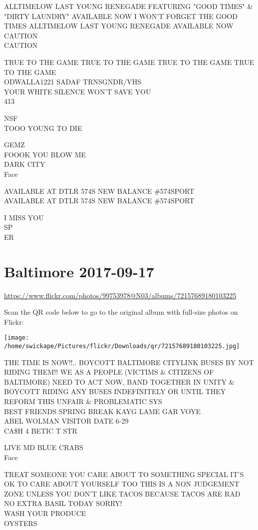 \documentclass[10pt,letterpaper]{article}
\begin{document}
ALLTIMELOW LAST YOUNG RENEGADE FEATURING "GOOD TIMES" \& "DIRTY LAUNDRY" AVAILABLE NOW I WON'T FORGET THE GOOD TIMES ALLTIMELOW LAST YOUNG RENEGADE AVAILABLE NOW\\
CAUTION\\
CAUTION

TRUE TO THE GAME TRUE TO THE GAME TRUE TO THE GAME TRUE TO THE GAME\\
ODWALLA1221 SADAF TRNSGNDR/VHS\\
YOUR WHITE SILENCE WON'T SAVE YOU\\
413

NSF\\
TOOO YOUNG TO DIE

GEMZ\\
FOOOK YOU BLOW ME\\
DARK CITY\\
Face

AVAILABLE AT DTLR 574S NEW BALANCE \#574SPORT\\
AVAILABLE AT DTLR 574S NEW BALANCE \#574SPORT

I MISS YOU\\
SP\\
ER


\section*{Baltimore 2017-09-17}

\url{https://www.flickr.com/photos/99753978@N03/albums/72157689180103225}

Scan the QR code below to go to the original album with full-size photos on Flickr:

\texttt{[image: /home/swickape/Pictures/flickr/Downloads/qr/72157689180103225.jpg]}


THE TIME IS NOW!!..  BOYCOTT BALTIMORE CITYLINK BUSES BY NOT RIDING THEM!!  WE AS A PEOPLE (VICTIMS \& CITIZENS OF BALTIMORE) NEED TO ACT NOW, BAND TOGETHER IN UNITY \& BOYCOTT RIDING ANY BUSES INDEFINITELY OR UNTIL THEY REFORM THIS UNFAIR \& PROBLEMATIC SYS\\
BEST FRIENDS SPRING BREAK KAYG LAME GAR VOYE\\
ABEL WOLMAN VISITOR DATE 6{-}29\\
CA\$H 4 BETIC T STR

LIVE MD BLUE CRABS\\
Face

TREAT SOMEONE YOU CARE ABOUT TO SOMETHING SPECIAL IT'S OK TO CARE ABOUT YOURSELF TOO THIS IS A NON JUDGEMENT ZONE UNLESS YOU DON'T LIKE TACOS BECAUSE TACOS ARE RAD\\
NO EXTRA BASIL TODAY SORRY!\\
WASH YOUR PRODUCE\\
OYSTERS
\end{document}
